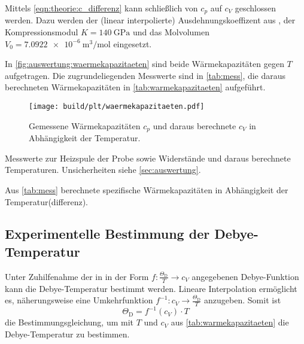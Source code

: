 Mittels \autoref{eqn:theorie:c_differenz} kann schließlich von $c_p$ auf $c_V$ geschlossen werden.
Dazu werden
der (linear interpolierte) Ausdehnungskoeffizent aus \cite[Tabelle 2]{versuchsanleitung},
der Kompressionsmodul $K = \SI{140}{\giga\pascal}$ \cite{periodictable} und
das Molvolumen $V_0 = \SI{7.0922e-6}{\cubic\meter\per\mol}$ \cite{periodictable} eingesetzt.

In \autoref{fig:auswertung:waermekapazitaeten} sind beide Wärmekapazitäten gegen $T$ aufgetragen.
Die zugrundeliegenden Messwerte sind in \autoref{tab:mess},
die daraus berechneten Wärmekapazitäten in \autoref{tab:warmekapazitaeten} aufgeführt.

\begin{figure}[H]
    \centering
    \texttt{[image: build/plt/waermekapazitaeten.pdf]}
    \caption{Gemessene Wärmekapazitäten $c_p$ und daraus berechnete $c_V$ in Abhängigkeit der Temperatur.}
    \label{fig:auswertung:waermekapazitaeten}
\end{figure}

\begin{table}
    \centering
    \caption{Messwerte zur Heizspule der Probe sowie Widerstände und daraus berechnete Temperaturen. Unsicherheiten siehe \autoref{sec:auswertung}.}
    \label{tab:mess}
\end{table}

\begin{table}
    \centering
    \caption{Aus \autoref{tab:mess} berechnete spezifische Wärmekapazitäten in Abhängigkeit der Temperatur(differenz).}
    \label{tab:warmekapazitaeten}
\end{table}


\subsection{Experimentelle Bestimmung der Debye-Temperatur}
\label{sec:auswertung:debye_exp}
Unter Zuhilfenahme der in \cite[Tabelle 1]{versuchsanleitung}
in der Form $f: \frac{\Theta_\text{D}}{T} \longrightarrow c_V$
angegebenen Debye-Funktion
kann die Debye-Temperatur bestimmt werden.
Lineare Interpolation ermöglicht es, näherungsweise eine Umkehrfunktion
$f^{-1}: c_V \longrightarrow \frac{\Theta_\text{D}}{T}$
anzugeben.
Somit ist
\[
    \Theta_\text{D} = f^{-1}(c_V) · T
\]
die Bestimmungsgleichung, um mit $T$ und $c_V$ aus \autoref{tab:warmekapazitaeten} die Debye-Temperatur zu bestimmen.

